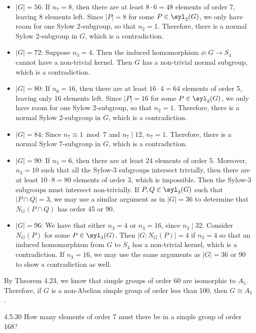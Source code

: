 \begin{sol}[spsol]
\begin{itemize}
		\item $|G| = 56$: If $n_7 = 8$, then there are at least $8 \cdot 6 = 48$ elements of order 7, leaving 8 elements left.
	Since $|P| = 8$ for some $P \in \syl_2(G)$, we only have room for one Sylow 2-subgroup, so that $n_2 = 1$.
	Therefore, there is a normal Sylow 2-subgroup in $G$, which is a contradiction.
		\item $|G| = 72$: Suppose $n_3 = 4$.
	Then the induced homomorphism $\phi : G \to S_4$ cannot have a non-trivial kernel.
	Then $G$ has a non-trivial normal subgroup, which is a contradiction.
		\item $|G| = 80$: If $n_6 = 16$, then there are at least $16 \cdot 4 = 64$ elements of order 5, leaving only 16 elements left.
	Since $|P| = 16$ for some $P \in \syl_2(G)$, we only have room for one Sylow 2-subgroup, so that $n_2 = 1$.
	Therefore, there is a normal Sylow 2-subgroup in $G$, which is a contradiction.
		\item $|G| = 84$: Since $n_7 \equiv 1 \bmod 7$ and $n_7 \mid 12$, $n_7 = 1$.
	Therefore, there is a normal Sylow 7-subgroup in $G$, which is a contradiction.
		\item $|G| = 90$: If $n_5 = 6$, then there are at least 24 elements of order 5.
	Moreover, $n_3 = 10$ such that all the Sylow-3 subgroups intersect trivially, then there are at least $10 \cdot 8 = 80$ elements of order 3, which is impossible.
	Then the Sylow-3 subgroups must intersect non-trivially.
	If $P, Q \in \syl_3(G)$ such that $|P \cap Q| = 3$, we may use a similar argument as in $|G| = 36$ to determine that $N_G(P \cap Q)$ has order 45 or 90.
		\item $|G| = 96$: We have that either $n_3 = 4$ or $n_3 = 16$, since $n_3 \mid 32$.
	Consider $N_G(P)$ for some $P \in \syl_3(G)$.
	Then $|G : N_G(P)| = 4$ if $n_3 = 4$ so that an induced homomorphism from $G$ to $S_4$ has a non-trivial kernel, which is a contradiction.
	If $n_3 = 16$, we may use the same arguments as $|G| = 36$ or 90 to show a contradiction as well.
	\end{itemize}
	By Theorem 4.23, we know that simple groups of order 60 are isomorphic to $A_5$.
	Therefore, if $G$ is a non-Abelian simple group of order less than 100, then $G \cong A_5$.
\end{sol}

\begin{exercise}{4.5.30}
	How many elements of order 7 must there be in a simple group of order 168?
\end{exercise}

